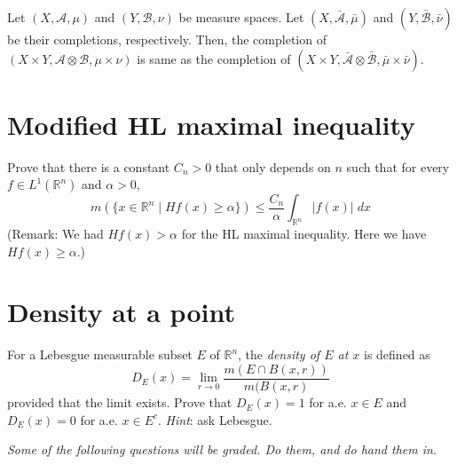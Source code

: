 \documentclass[lang=cn,11pt]{elegantbook}
\begin{document}
Let $(X, \mathcal{A}, \mu)$ and $(Y, \mathcal{B}, \nu)$ be measure spaces. Let $(X, \bar{\mathcal{A}}, \bar{\mu})$ and $(Y, \bar{\mathcal{B}}, \bar{\nu})$ be their completions, respectively. 
Then, the completion of $(X\times Y, \mathcal{A}\otimes \mathcal{B}, \mu\times \nu)$ is same as the completion of $(X\times Y, \bar{\mathcal{A}}\otimes \bar{\mathcal{B}}, \bar{\mu}\times \bar{\nu})$.

\section{Modified HL maximal inequality}
Prove that there is a constant $C_n>0$ that only depends on $n$ such that for every $f\in L^1(\mathbb{R}^n)$ and $\alpha>0$,
\[
m(\{x\in \mathbb{R}^n\mid Hf(x)\ge \alpha\}) \le \frac{C_n}{\alpha} \int_{\mathbb{R}^n} |f(x)|\;d x
\]
(Remark: We had $Hf(x)> \alpha$ for the HL maximal inequality. Here we have $Hf(x)\ge \alpha$.) 





\section{Density at a point}
  For a Lebesgue measurable subset $E$ of $\mathbb{R}^n$, the \emph{density of $E$ at $x$} is defined as 
  \[
    D_E(x)= \lim_{r\to 0} \frac{m(E\cap B(x,r))}{m(B(x,r)}
  \]
  provided that the limit exists.
  Prove that $D_E(x)=1$ for a.e. $x\in E$ and $D_E(x)=0$ for a.e. $x\in E^c$. 
  \textit{Hint}: ask Lebesgue.


\newpage
\vspace*{5mm}
\begin{center}
\textit{Some of the following questions will be graded. Do them, and do hand them in}.
\end{center}
\end{document}
